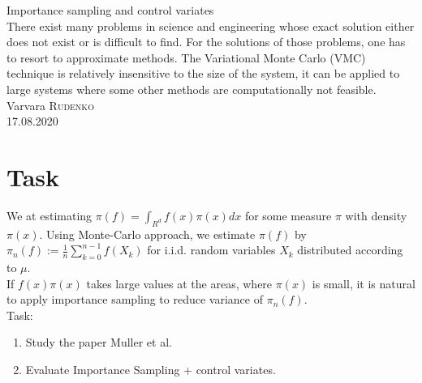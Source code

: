 \documentclass{article}
\begin{document}
	\begin{titlepage}
		\begin{center}
			\vspace*{12em}
			\large{Importance sampling and control variates}\\
			\vspace{3em}
			\normalsize{There exist many problems in science and engineering whose exact solution either does not exist or is difficult to find. For the solutions of those problems, one has to resort to approximate methods. The Variational Monte Carlo (VMC) technique is relatively insensitive to the size of the system, it can be applied to large systems where some other methods are computationally not feasible.}\\
			\vspace{6em}
			\small{Varvara \textsc{Rudenko}}\\
			\vspace{5em}
			\small{17.08.2020}\\
			\thispagestyle{empty}
		\end{center}                             
	\end{titlepage}

\newpage
	\tableofcontents
\newpage

\section{Task}
We at estimating ${\pi(f)=\int_{{R}^{d}}f(x)\pi(x)dx}$ for some measure ${\pi}$ with density ${\pi(x)}$. Using Monte-Carlo approach, we estimate ${\pi(f)}$ by ${{\pi}_{n}(f):=\frac{1}{n}\sum_{k=0}^{n-1}f(X_{k})}$ for i.i.d. random variables ${X_{k}}$ distributed according to ${\mu}$.\\

If ${f(x)\pi(x)}$ takes large values at the areas, where ${\pi(x)}$ is small, it is natural to apply importance sampling to reduce variance of ${\pi_{n}(f)}$.\\
Task:
\begin{enumerate}
	\item Study the paper Muller et al.
	\item Evaluate Importance Sampling + control variates.
\end{enumerate}
\end{document}
